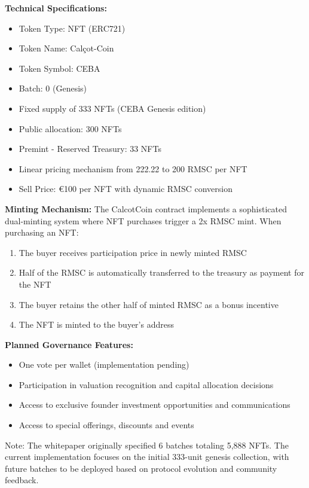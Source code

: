 \documentclass[conference]{IEEEtran}
\begin{document}
\textbf{Technical Specifications:}
\begin{itemize}
    \item Token Type: NFT (ERC721)
    \item Token Name: Calçot-Coin
    \item Token Symbol: CEBA
    \item Batch: 0 (Genesis)
    \item Fixed supply of 333 NFTs (CEBA Genesis edition)
    \item Public allocation: 300 NFTs
    \item Premint - Reserved Treasury: 33 NFTs
    \item Linear pricing mechanism from 222.22 to 200 RMSC per NFT
    \item Sell Price: €100 per NFT with dynamic RMSC conversion
\end{itemize}

\textbf{Minting Mechanism:}
The CalcotCoin contract implements a sophisticated dual-minting system where NFT purchases trigger a 2x RMSC mint. When purchasing an NFT:
\begin{enumerate}
    \item The buyer receives participation price in newly minted RMSC
    \item Half of the RMSC is automatically transferred to the treasury as payment for the NFT
    \item The buyer retains the other half of minted RMSC as a bonus incentive
    \item The NFT is minted to the buyer's address
\end{enumerate}

\textbf{Planned Governance Features:}
\begin{itemize}
    \item One vote per wallet (implementation pending)
    \item Participation in valuation recognition and capital allocation decisions
    \item Access to exclusive founder investment opportunities and communications
    \item Access to special offerings, discounts and events
\end{itemize}

Note: The whitepaper originally specified 6 batches totaling 5,888 NFTs. The current implementation focuses on the initial 333-unit genesis collection, with future batches to be deployed based on protocol evolution and community feedback.
\end{document}
